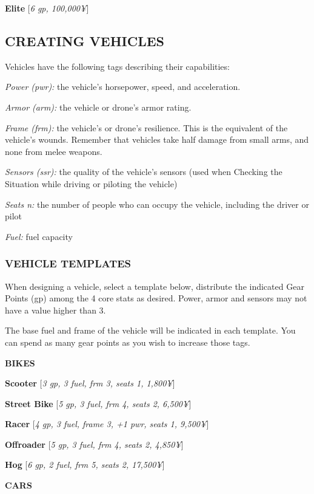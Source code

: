 \documentclass[oneside,10pt]{article}
\begin{document}
\begin{multicols}{2}
\textbf{Elite} [\textit{6 gp, 100,000¥}]

\subsection{CREATING VEHICLES}
Vehicles have the following tags describing their capabilities:

\begin{dent}

\textit{Power (pwr):} the vehicle’s horsepower, speed, and acceleration.

\textit{Armor (arm):} the vehicle or drone’s armor rating.

\textit{Frame (frm):} the vehicle’s or drone’s resilience. This is the
equivalent of the vehicle’s wounds. Remember that vehicles take half damage from small arms, and none from
melee weapons.

\textit{Sensors (ssr):} the quality of the vehicle’s sensors (used
when Checking the Situation while driving or piloting the
vehicle)

\textit{Seats n:} the number of people who can occupy the vehicle,
including the driver or pilot

\textit{Fuel:} fuel capacity
\end{dent}

\subsubsection{VEHICLE TEMPLATES}
When designing a vehicle, select a template below, distribute
the indicated Gear Points (gp) among the 4 core stats as desired. Power, armor and sensors may not have a value higher
than 3.

The base fuel and frame of the vehicle will be indicated in
each template. You can spend as many gear points as you
wish to increase those tags.

\textbf{BIKES}

\textbf{Scooter} [\textit{3 gp, 3 fuel, frm 3, seats 1, 1,800¥}]

\textbf{Street Bike} [\textit{5 gp, 3 fuel, frm 4, seats 2, 6,500¥}]

\textbf{Racer} [\textit{4 gp, 3 fuel, frame 3, +1 pwr, seats 1, 9,500¥}]

\textbf{Offroader} [\textit{5 gp, 3 fuel, frm 4, seats 2, 4,850¥}]

\textbf{Hog} [\textit{6 gp, 2 fuel, frm 5, seats 2, 17,500¥}]

\textbf{CARS}


\end{multicols}
\end{document}
